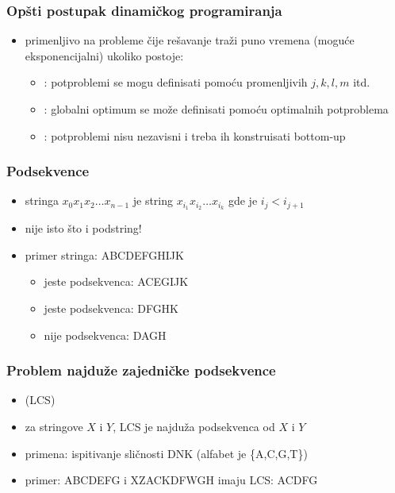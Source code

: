 \documentclass[compress,aspectratio=169]{beamer}
\begin{document}
\begin{frame}[fragile]
  \frametitle{Opšti postupak dinamičkog programiranja}
  \begin{itemize}
    \item primenljivo na probleme čije rešavanje traži puno vremena 
    (moguće eksponencijalni) ukoliko postoje:
    \begin{itemize}
      \item {}: potproblemi se mogu 
      definisati pomoću promenljivih $j,k,l,m$ itd.
      \item {}: globalni optimum se može 
      definisati pomoću optimalnih potproblema
      \item {}: potproblemi nisu nezavisni
      i treba ih konstruisati bottom-up
    \end{itemize}
  \end{itemize}
\end{frame}

\begin{frame}[fragile]
  \frametitle{Podsekvence}
  \begin{itemize}
    \item {} stringa $x_{0}x_{1}x_{2}\ldots x_{n-1}$ je
    string $x_{i_{1}}x_{i_{2}}\ldots x_{i_{k}}$ gde je $i_{j}<i_{j+1}$
    \item nije isto što i podstring!
    \item primer stringa: ABCDEFGHIJK
    \begin{itemize}
      \item jeste podsekvenca: ACEGIJK
      \item jeste podsekvenca: DFGHK
      \item nije podsekvenca: DAGH
    \end{itemize}
  \end{itemize}
\end{frame}

\begin{frame}[fragile]
  \frametitle{Problem najduže zajedničke podsekvence}
  \begin{itemize}
    \item {} (LCS)
    \item za stringove $X$ i $Y$, LCS je najduža podsekvenca od $X$ i $Y$
    \item primena: ispitivanje sličnosti DNK (alfabet je \{A,C,G,T\})
    \item primer: ABCDEFG i XZACKDFWGH imaju LCS: ACDFG
  \end{itemize}
\end{frame}
\end{document}

